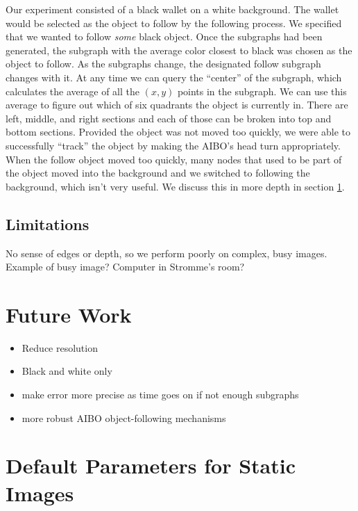 \documentclass{article}
\renewcommand{\|}{\origbar} %
\begin{document}
Our experiment consisted of a black wallet on a white background. The wallet would be selected as the object to follow by the following process. We specified that we wanted to follow {\em some} black object. Once the subgraphs had been generated, the subgraph with the average color closest to black was chosen as the object to follow. As the subgraphs change, the designated follow subgraph changes with it. At any time we can query the ``center'' of the subgraph, which calculates the average of all the $(x,y)$ points in the subgraph. We can use this average to figure out which of six quadrants the object is currently in. There are left, middle, and right sections and each of those can be broken into top and bottom sections. Provided the object was not moved too quickly, we were able to successfully ``track'' the object by making the AIBO's head turn appropriately. When the follow object moved too quickly, many nodes that used to be part of the object moved into the background and we switched to following the background, which isn't very useful. We discuss this in more depth in section \ref{sec:future}.

\subsection{Limitations}

No sense of edges or depth, so we perform poorly on complex, busy images. Example of busy image? Computer in Stromme's room?

\section{Future Work}
\label{sec:future}

\begin{itemize}
  \item Reduce resolution
  \item Black and white only
  \item make error more precise as time goes on if not enough subgraphs
  \item more robust AIBO object-following mechanisms
\end{itemize}

\appendix
\section{Default Parameters for Static Images}
\label{appendix:staticImgParams}
\end{document}
